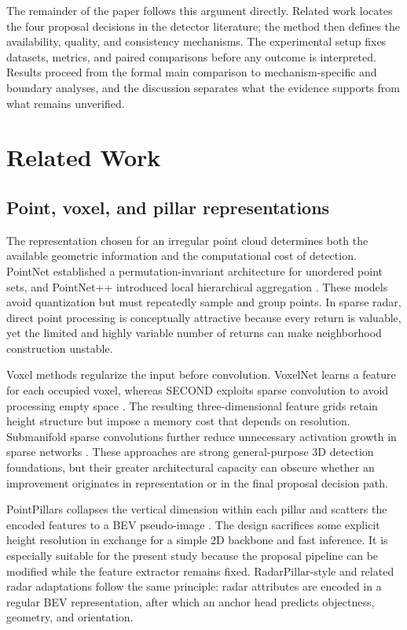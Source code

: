 \documentclass[preprint,12pt,times]{elsarticle}
\begin{document}
The remainder of the paper follows this argument directly. Related work
locates the four proposal decisions in the detector literature; the method
then defines the availability, quality, and consistency mechanisms. The
experimental setup fixes datasets, metrics, and paired comparisons before any
outcome is interpreted. Results proceed from the formal main comparison to
mechanism-specific and boundary analyses, and the discussion separates what
the evidence supports from what remains unverified.

\section{Related Work}

\subsection{Point, voxel, and pillar representations}

The representation chosen for an irregular point cloud determines both the
available geometric information and the computational cost of detection.
PointNet established a permutation-invariant architecture for unordered point
sets, and PointNet++ introduced local hierarchical aggregation
\cite{qi2017pointnet,qi2017pointnetpp}. These models avoid quantization but
must repeatedly sample and group points. In sparse radar, direct point
processing is conceptually attractive because every return is valuable, yet
the limited and highly variable number of returns can make neighborhood
construction unstable.

Voxel methods regularize the input before convolution. VoxelNet learns a
feature for each occupied voxel, whereas SECOND exploits sparse convolution to
avoid processing empty space \cite{zhou2018voxelnet,yan2018second}. The
resulting three-dimensional feature grids retain height structure but impose a
memory cost that depends on resolution. Submanifold sparse convolutions further
reduce unnecessary activation growth in sparse networks
\cite{graham2018submanifold}. These approaches are strong general-purpose 3D
detection foundations, but their greater architectural capacity can obscure
whether an improvement originates in representation or in the final proposal
decision path.

PointPillars collapses the vertical dimension within each pillar and scatters
the encoded features to a BEV pseudo-image \cite{lang2019pointpillars}. The
design sacrifices some explicit height resolution in exchange for a simple 2D
backbone and fast inference. It is especially suitable for the present study
because the proposal pipeline can be modified while the feature extractor
remains fixed. RadarPillar-style and related radar adaptations follow the same
principle: radar attributes are encoded in a regular BEV representation, after
which an anchor head predicts objectness, geometry, and orientation.
\end{document}
